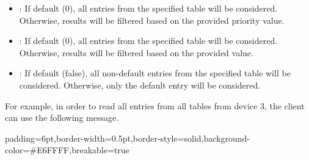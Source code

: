 \documentclass[11pt]{article}
\begin{document}
{\begin{itemize}[noitemsep,topsep=\mdcompacttopsep]
\item{}: If default (0), all entries from the specified table will be
considered. Otherwise, results will be filtered based on the provided priority
value.%

\item{}: If default (0), all entries from the specified table
will be considered. Otherwise, results will be filtered based on the provided
 value.%

\item{}: If default (false), all non-default entries from the
specified table will be considered. Otherwise, only the default entry will be
considered.%
\end{itemize}%

\noindent{}For example, in order to read all entries from all tables from device 3, the
client can use the following  message.%

\begin{mdbmargintb}{6pt}{6pt}%
\begin{mdblock}{padding=6pt,border-width=0.5pt,border-style=solid,background-color=\#E6FFFF,breakable=true}%
\begin{mdpre}%
\end{mdpre}%
\end{mdblock}%
\end{mdbmargintb}%

}
\end{document}
